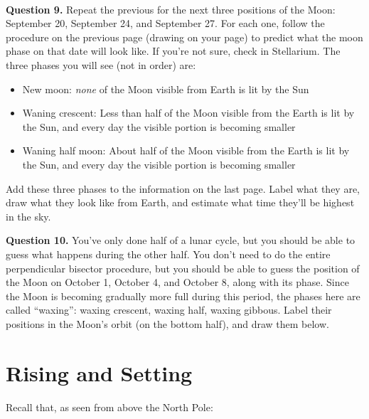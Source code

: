 \documentclass[11pt]{article}
\begin{document}
\vspace*{1.5cm}

\hrulefill\\
\newpage

\textbf{Question 9.} Repeat the previous for the next three positions of the Moon: September 20, September 24, and September 27. 
For each one, follow the procedure on the previous page (drawing on your page) to predict what the moon phase on that date will look like.
If you're not sure, check in Stellarium. The three phases you will see (not in order) are:

\begin{itemize}
	\item New moon: {\it none} of the Moon visible from Earth is lit by the Sun
	\item Waning crescent: Less than half of the Moon visible from the Earth is lit by the Sun, and every day the visible portion is becoming smaller
	\item Waning half moon: About half of the Moon visible from the Earth is lit by the Sun, and every day the visible portion is becoming smaller
\end{itemize}

Add these three phases to the information on the last page. Label what they are, draw what they look like from Earth, and 
estimate what time they'll be highest in the sky.

\vspace{1in}

\textbf{Question 10.} You've only done half of a lunar cycle, but you should be able to guess what happens during the other half.
You don't need to do the entire perpendicular bisector procedure, but you should be able to guess the position of the Moon on 
October 1, October 4, and October 8, along with its phase. Since the Moon is becoming gradually more full during this period, 
the phases here are called ``waxing'': waxing crescent, waxing half, waxing gibbous. Label their positions in the Moon's orbit (on the bottom half), and draw them below.

\newpage

\section{Rising and Setting}

Recall that, as seen from above the North Pole:
\end{document}

